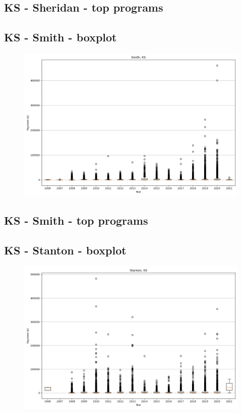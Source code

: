 \subsection*{KS - Sheridan - top programs}

\newpage
\subsection*{KS - Smith - boxplot}
\begin{figure}[h]
\centering
\includegraphics[width=7in]{../output/boxplots/counties/Smith-KS_boxplot.png}
\end{figure}


\subsection*{KS - Smith - top programs}

\newpage
\subsection*{KS - Stanton - boxplot}
\begin{figure}[h]
\centering
\includegraphics[width=7in]{../output/boxplots/counties/Stanton-KS_boxplot.png}
\end{figure}


